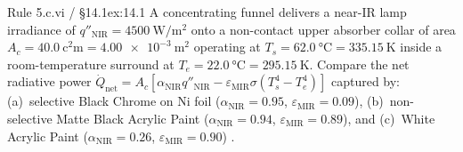 \begin{workedexample}{Rule 5.c.vi / §14.1}{ex:14.1}
A concentrating funnel delivers a near-IR lamp irradiance of $q''_{\mathrm{NIR}} = \SI{4500}{\watt\per\square\meter}$ onto a non-contact upper absorber collar of area $A_c = \SI{40.0}{\square\centi\meter} = \SI{4.00e-3}{\square\meter}$ operating at $T_s = \SI{62.0}{\celsius} = \SI{335.15}{\kelvin}$ inside a room-temperature surround at $T_e = \SI{22.0}{\celsius} = \SI{295.15}{\kelvin}$. Compare the net radiative power $\dot{Q}_{\mathrm{net}} = A_c[\alpha_{\mathrm{NIR}}q''_{\mathrm{NIR}} - \varepsilon_{\mathrm{MIR}}\sigma(T_s^4 - T_e^4)]$ captured by: (a)~selective Black Chrome on Ni foil ($\alpha_{\mathrm{NIR}} = 0.95$, $\varepsilon_{\mathrm{MIR}} = 0.09$), (b)~non-selective Matte Black Acrylic Paint ($\alpha_{\mathrm{NIR}} = 0.94$, $\varepsilon_{\mathrm{MIR}} = 0.89$), and (c)~White Acrylic Paint ($\alpha_{\mathrm{NIR}} = 0.26$, $\varepsilon_{\mathrm{MIR}} = 0.90$) .


\end{workedexample}

